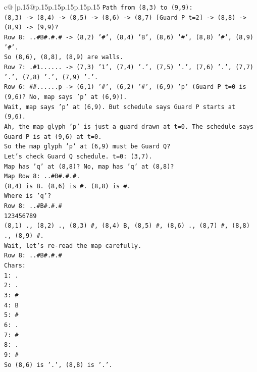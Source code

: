 \documentclass{article}
\begin{document}
{\begin{supertabular}{c@{$\;$}|p{.15\linewidth}@{}p{.15\linewidth}p{.15\linewidth}p{.15\linewidth}p{.15\linewidth}p{.15\linewidth}}
{{{\texttt{Path from (8,3) to (9,9):} \\
\texttt{(8,3) {-}> (8,4) {-}> (8,5) {-}> (8,6) {-}> (8,7) {[}Guard P t=2{]} {-}> (8,8) {-}> (8,9) {-}> (9,9)?} \\
\texttt{Row 8: ..\#B\#.\#.\# {-}> (8,2) '\#', (8,4) 'B', (8,6) '\#', (8,8) '\#', (8,9) '\#'.} \\
\texttt{So (8,6), (8,8), (8,9) are walls.} \\
\texttt{Row 7: .\#1...... {-}> (7,3) '1', (7,4) '.', (7,5) '.', (7,6) '.', (7,7) '.', (7,8) '.', (7,9) '.'.} \\
\texttt{Row 6: \#\#......p {-}> (6,1) '\#', (6,2) '\#', (6,9) 'p' (Guard P t=0 is (9,6)? No, map says 'p' at (6,9)).} \\
\texttt{Wait, map says 'p' at (6,9). But schedule says Guard P starts at (9,6).} \\
\texttt{Ah, the map glyph 'p' is just a guard drawn at t=0. The schedule says Guard P is at (9,6) at t=0.} \\
\texttt{So the map glyph 'p' at (6,9) must be Guard Q?} \\
\texttt{Let's check Guard Q schedule. t=0: (3,7).} \\
\texttt{Map has 'q' at (8,8)? No, map has 'q' at (8,8)?} \\
\texttt{Map Row 8: ..\#B\#.\#.\#.} \\
\texttt{(8,4) is B. (8,6) is \#. (8,8) is \#.} \\
\texttt{Where is 'q'?} \\
\texttt{Row 8: ..\#B\#.\#.\#} \\
\texttt{123456789} \\
\texttt{(8,1) ., (8,2) ., (8,3) \#, (8,4) B, (8,5) \#, (8,6) ., (8,7) \#, (8,8) ., (8,9) \#.} \\
\texttt{Wait, let's re{-}read the map carefully.} \\
\texttt{Row 8: ..\#B\#.\#.\#} \\
\texttt{Chars:} \\
\texttt{1: .} \\
\texttt{2: .} \\
\texttt{3: \#} \\
\texttt{4: B} \\
\texttt{5: \#} \\
\texttt{6: .} \\
\texttt{7: \#} \\
\texttt{8: .} \\
\texttt{9: \#} \\
\texttt{So (8,6) is '.', (8,8) is '.'.} \\
}}}
\end{supertabular}}
\end{document}
